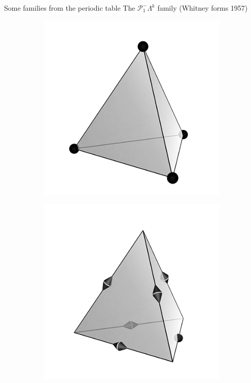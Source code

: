 \documentclass[aspectratio=169]{beamer}
\begin{document}
\begin{frame}{Some families from the periodic table}
The $\mathcal{P}^-_1\Lambda^k$ family (Whitney forms 1957)
\begin{figure}[t]
	\begin{subfigure}[t]{0.23\textwidth}
		\includegraphics[width=\columnwidth]{P1_tetrahedron.png}%
	\end{subfigure}
	\begin{subfigure}[t]{0.23\textwidth}
		\includegraphics[width=\columnwidth]{N1e1_tetrahedron.png}%

\end{subfigure}
\end{figure}
\end{frame}
\end{document}
